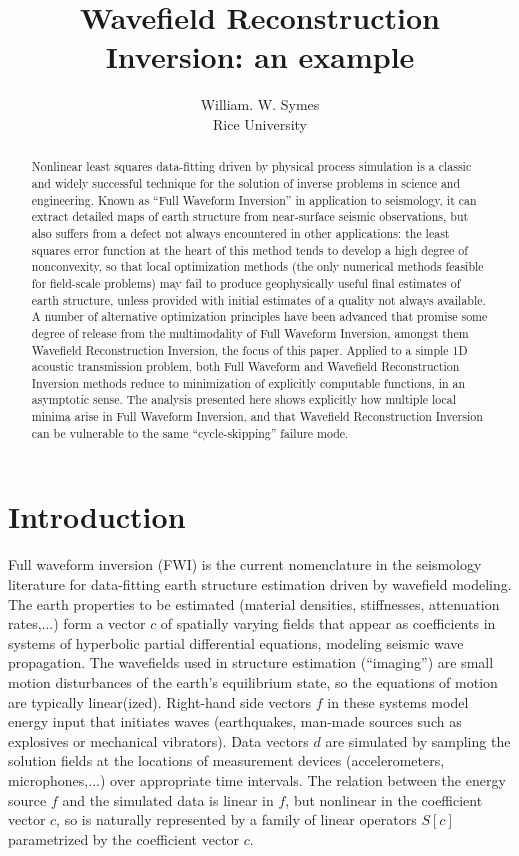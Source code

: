 \address{email: {\tt symes@rice.edu}}
\title{Wavefield Reconstruction Inversion: an example}
\author{William. W. Symes\\Rice University}



\begin{abstract}
  Nonlinear least squares data-fitting driven by physical process
  simulation is a classic and widely successful technique for the
  solution of inverse problems in science and engineering. Known as
  ``Full Waveform Inversion'' in application to seismology, it can
  extract detailed maps of earth structure from near-surface seismic
  observations, but also suffers from a defect not always encountered
  in other applications: the least squares error function at the heart
  of this method tends to develop a high degree of nonconvexity, so
  that local optimization methods (the only numerical methods feasible
  for field-scale problems) may fail to produce geophysically useful
  final estimates of earth structure, unless provided with initial
  estimates of a quality not always available. A number of alternative
  optimization principles have been advanced that promise some degree
  of release from the multimodality of Full Waveform Inversion,
  amongst them Wavefield Reconstruction Inversion, the focus of this
  paper. Applied to a simple 1D acoustic transmission problem, both
  Full Waveform and Wavefield Reconstruction Inversion methods reduce
  to minimization of explicitly computable functions, in an asymptotic
  sense. The analysis presented here shows explicitly how multiple
  local minima arise in Full Waveform Inversion, and that Wavefield
  Reconstruction Inversion can be vulnerable to the same
  ``cycle-skipping'' failure mode.
\end{abstract}

\section{Introduction}

Full waveform inversion (FWI) is the current nomenclature in the
seismology literature for data-fitting earth structure estimation
driven by wavefield modeling. The earth properties to be estimated
(material densities, stiffnesses, attenuation rates,...) form a vector
$c$ of spatially varying fields that appear as coefficients in systems of hyperbolic
partial differential equations, modeling seismic wave
propagation. The wavefields used in structure estimation (``imaging'')
are small motion disturbances of the earth's equilibrium state, so the
equations of motion are typically 
linear(ized). Right-hand side vectors $f$ in these systems model energy
input that initiates waves (earthquakes, man-made sources such as
explosives or mechanical vibrators). Data vectors $d$ are simulated by
sampling the solution fields at the locations of measurement devices
(accelerometers, microphones,...)  over appropriate time
intervals. The relation between the energy source $f$ and the
simulated data is linear in $f$, but nonlinear in the coefficient
vector $c$, so is naturally represented by a family of linear
operators $S[c]$ parametrized by the coefficient vector $c$.

